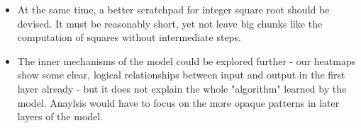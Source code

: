 \begin{itemize}
\item At the same time, a better scratchpad for integer square root should be devised. It must be reasonably short, yet not leave big chunks like the computation of squares without intermediate steps.

\item The inner mechanisms of the model could be explored further - our heatmaps show some clear, logical relationships between input and output in the first layer already - but it does not explain the whole "algorithm" learned by the model. Anaylsis would have to focus on the more opaque patterns in later layers of the model.
\end{itemize}